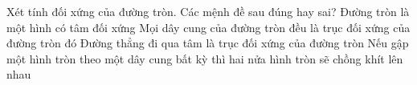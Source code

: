 \begin{ex}%
	Xét tính đối xứng của đường tròn. Các mệnh đề sau đúng hay sai?
	\choiceTF
	{\True Đường tròn là một hình có tâm đối xứng}
	{Mọi dây cung của đường tròn đều là trục đối xứng của đường tròn đó}
	{\True Đường thẳng đi qua tâm là trục đối xứng của đường tròn}
	{Nếu gập một hình tròn theo một dây cung bất kỳ thì hai nửa hình tròn sẽ chồng khít lên nhau}
\end{ex}
